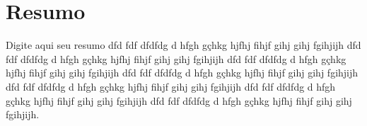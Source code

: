 \documentclass[12pt, a4paper, oneside]{book}
\begin{document}

\frontmatter










\pagestyle{myheadings} %
\newpage

\chapter*{Resumo}
\thispagestyle{myheadings}
\noindent
Digite aqui seu resumo dfd fdf dfdfdg d hfgh gçhkg hjfhj fihjf gihj gihj fgihjijh dfd fdf dfdfdg d hfgh gçhkg hjfhj fihjf gihj gihj fgihjijh dfd fdf dfdfdg d hfgh gçhkg hjfhj fihjf gihj gihj fgihjijh dfd fdf dfdfdg d hfgh gçhkg hjfhj fihjf gihj gihj fgihjijh dfd fdf dfdfdg d hfgh gçhkg hjfhj fihjf gihj gihj fgihjijh dfd fdf dfdfdg d hfgh gçhkg hjfhj fihjf gihj gihj fgihjijh dfd fdf dfdfdg d hfgh gçhkg hjfhj fihjf gihj gihj fgihjijh.
 
\end{document}
